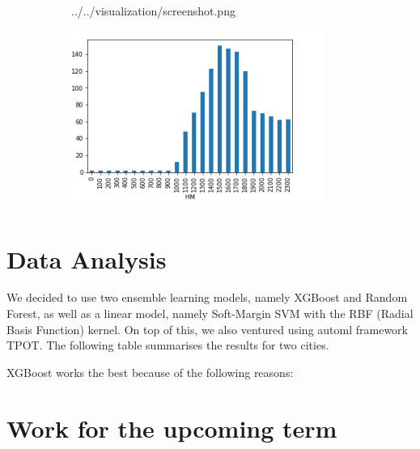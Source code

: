 \documentclass[10pt]{article}
\begin{document}
\begin{figure}[H]
\begin{subfigure}[t]{0.45\textwidth}
        {../../visualization/screenshot.png}
    \end{subfigure}
    \begin{subfigure}[t]{0.45\textwidth}
        \caption{}
        \centering
        \includegraphics[width=0.9\textwidth]{sanfrancisco_hour.png}
    \end{subfigure}
\end{figure}

\section{Data Analysis}

We decided to use two ensemble learning models, namely XGBoost and
Random Forest, as well as a linear model, namely Soft-Margin SVM with the RBF
(Radial Basis Function) kernel. On top of
this, we also ventured using automl framework TPOT. The following table
summarises the results for two cities. \par
XGBoost works the best because of the following reasons:




\section{Work for the upcoming term}
\end{document}
